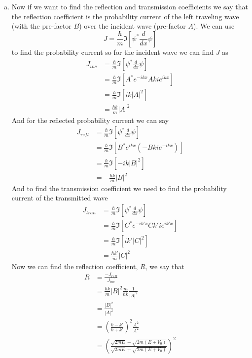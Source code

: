 \documentclass[11pt]{article}
\numberwithin{equation}{section}
\begin{document}
\begin{enumerate}[(a)]
\item
Now if we want to find the reflection and transmission coefficients we say that the reflection coefficient is the probability current of the left traveling wave (with the pre-factor $B$) over the incident wave (pre-factor $A$). We can use 
\begin{equation}
J=\frac{\hbar}{m}\Im\left[\psi^*\frac{d}{dx}\psi\right]
\label{ProbCurr}
\end{equation}
to find the probability current so for the incident wave we can find $J$ as
\begin{align*}
J_{inc} &= \frac{\hbar}{m}\Im\left[\psi^*\frac{d}{dx}\psi\right]\\
&= \frac{\hbar}{m}\Im\left[A^*e^{-ikx}Akie^{ikx}\right]\\
&= \frac{\hbar}{m}\Im\left[ik|A|^2\right]\\
&= \frac{\hbar k}{m}|A|^2
\end{align*}
And for the reflected probability current we can say
\begin{align*}
J_{refl} &= \frac{\hbar}{m}\Im\left[\psi^*\frac{d}{dx}\psi\right]\\
&= \frac{\hbar}{m}\Im\left[B^*e^{ikx}\left(-Bkie^{-ikx}\right)\right]\\
&= \frac{\hbar}{m}\Im\left[-ik|B|^2\right]\\
&= -\frac{\hbar k}{m}|B|^2
\end{align*}
And to find the transmission coefficient we need to find the probability current of the transmitted wave
\begin{align*}
J_{tran} &= \frac{\hbar}{m}\Im\left[\psi^*\frac{d}{dx}\psi\right]\\
&= \frac{\hbar}{m}\Im\left[C^*e^{-ik'x}Ck'ie^{ik'x}\right]\\
&= \frac{\hbar}{m}\Im\left[ik'|C|^2\right]\\
&= \frac{\hbar k'}{m}|C|^2
\end{align*}
Now we can find the reflection coefficient, $R$, we say that
\begin{align*}
R &= \frac{-J_{refl}}{J_{inc}}\\
&= \frac{\hbar k}{m}|B|^2\frac{m}{\hbar k}\frac{1}{|A|^2}\\
&= \frac{|B|^2}{|A|^2}\\
&= \left(\frac{k-k'}{k+k'}\right)^2\frac{A^2}{A^2}\\
&= \left(\frac{\sqrt{2mE}-\sqrt{2m(E+V_0)}}{\sqrt{2mE}+\sqrt{2m(E+V_0)}}\right)^2\\
\end{align*}

\end{enumerate}
\end{document}
